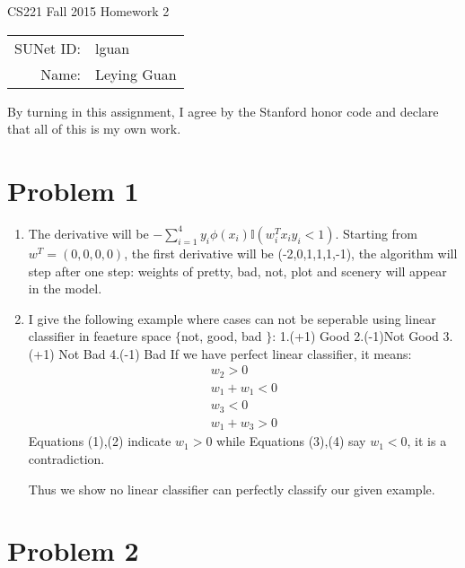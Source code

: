 \documentclass[12pt]{article}
\begin{document}
\begin{center}
{\Large CS221 Fall 2015 Homework 2}

\begin{tabular}{rl}
SUNet ID: & lguan \\
Name: & Leying Guan \\
\end{tabular}
\end{center}

By turning in this assignment, I agree by the Stanford honor code and declare
that all of this is my own work.

\section*{Problem 1}

\begin{enumerate}[label=(\alph*)]
  \item The derivative will be $-\sum^4_{i=1}y_i\phi(x_i)\mathbb{I}(w^T_ix_iy_i < 1)$. Starting from $w^T = (0,0,0,0)$, the first derivative will be (-2,0,1,1,1,-1), the algorithm will step after one step: weights of pretty, bad, not, plot and scenery will appear in the model.
  
  \item I give the following example where cases can not be seperable using linear classifier in feaeture space $\{$not, good, bad $\}$:
  1.(+1) Good
  2.(-1)Not Good
  3.(+1) Not Bad
  4.(-1) Bad
  If we have perfect linear classifier, it means:
  \begin{align}
  w_2 >0\\
  w_1 + w_1 < 0\\
  w_3 < 0\\
  w_1 + w_3 > 0
  \end{align}
  Equations (1),(2) indicate $w_1 > 0$ while Equations (3),(4) say $w_1 <0$, it is a contradiction.
  
  Thus we show no linear classifier can perfectly classify our given example.
\end{enumerate}
\section*{Problem 2}
\end{document}
